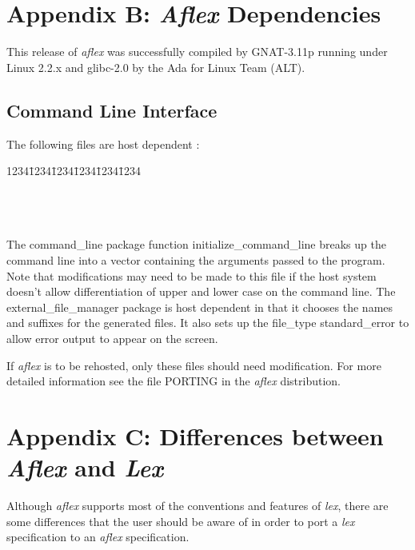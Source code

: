 \newpage
\section{Appendix B: {\sl Aflex} Dependencies}

This release of {\sl aflex} was successfully compiled by GNAT-3.11p
running under Linux 2.2.x and glibc-2.0 by the Ada for Linux Team (ALT).

\subsection{Command Line Interface}
The following files are host dependent : 
\begin{tabbing}
1234\=1234\=1234\=1234\=1234\=1234 \kill
    \>    \\
    \>    \\
    \>    \\
    \>    \\
\end{tabbing}
The command\_line package function {\sc initialize\_command\_line}
breaks up the command line into a vector containing
the arguments passed to the program.  Note that modifications may need
to be made to this file if the host system doesn't allow differentiation
of upper and lower case on the command line.
\mysk
The external\_file\_manager package is host dependent in that it chooses
the names and suffixes for the generated files.  It also sets up the
file\_type {\sc standard\_error} to allow error output to appear on the
screen.

\mysk
If {\sl aflex} is to be rehosted, only these files should need modification.
For more detailed information see the file PORTING in the {\sl aflex}
distribution.
\newpage
\section{Appendix C: Differences between {\sl Aflex} and {\sl Lex}}
\label{lexdiff}

Although {\sl aflex} supports most of the
conventions and features of {\sl lex}, there are some differences
that the user should be aware of in order to port a {\sl lex} specification
to an {\sl aflex} specification.

